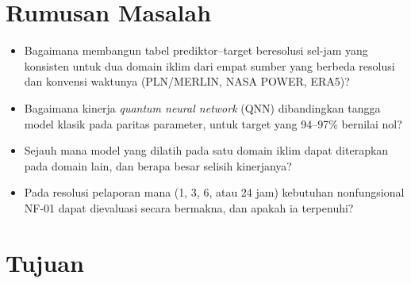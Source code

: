 
\section{Rumusan Masalah}

\begin{itemize}
    \item Bagaimana membangun tabel prediktor--target beresolusi sel-jam yang
          konsisten untuk dua domain iklim dari empat sumber yang berbeda
          resolusi dan konvensi waktunya (PLN/MERLIN, NASA POWER, ERA5)?
    \item Bagaimana kinerja \textit{quantum neural network} (QNN) dibandingkan
          tangga model klasik pada paritas parameter, untuk target yang
          94--97\% bernilai nol?
    \item Sejauh mana model yang dilatih pada satu domain iklim dapat
          diterapkan pada domain lain, dan berapa besar selisih kinerjanya?
    \item Pada resolusi pelaporan mana (1, 3, 6, atau 24 jam) kebutuhan
          nonfungsional NF-01 dapat dievaluasi secara bermakna, dan apakah ia
          terpenuhi?
\end{itemize}

\section{Tujuan}


